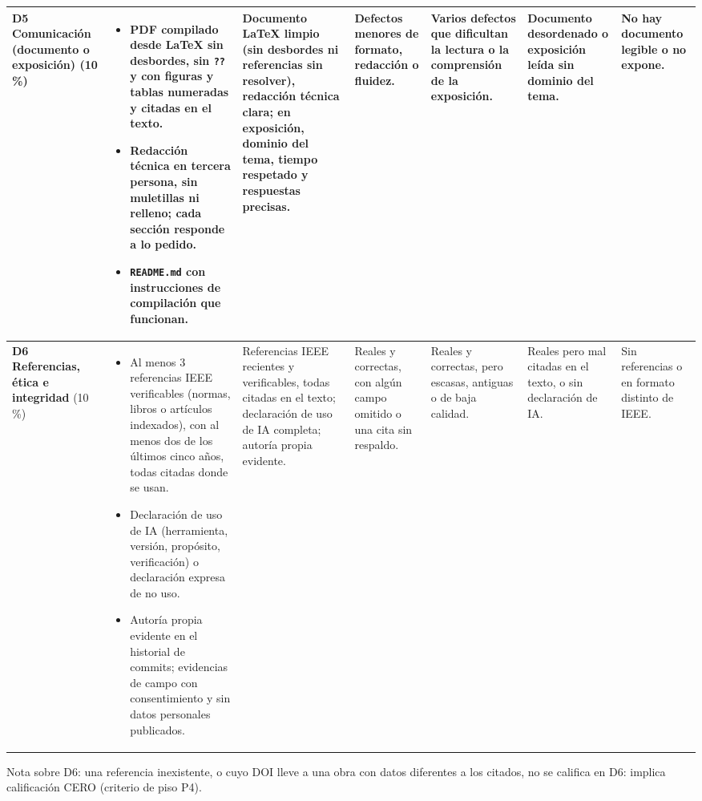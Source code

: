 \documentclass[11pt]{article}
\begin{document}
\begin{landscape}
{\begin{longtable}{|L{2.4cm}|L{5.6cm}|L{3.1cm}|L{2.8cm}|L{2.8cm}|L{2.7cm}|L{2.1cm}|}
	\textbf{D5 Comunicación (documento o exposición)} (10\,\%) & \begin{itemize}[leftmargin=9pt,itemsep=0pt,topsep=0pt,parsep=0pt,partopsep=0pt,after=\vspace{-\baselineskip}]\item PDF compilado desde \LaTeX{} sin desbordes, sin \texttt{??} y con figuras y tablas numeradas y citadas en el texto.\item Redacción técnica en tercera persona, sin muletillas ni relleno; cada sección responde a lo pedido.\item \texttt{README.md} con instrucciones de compilación que funcionan.\end{itemize} & Documento \LaTeX{} limpio (sin desbordes ni referencias sin resolver), redacción técnica clara; en exposición, dominio del tema, tiempo respetado y respuestas precisas. & Defectos menores de formato, redacción o fluidez. & Varios defectos que dificultan la lectura o la comprensión de la exposición. & Documento desordenado o exposición leída sin dominio del tema. & No hay documento legible o no expone.\\
	\hline
	\textbf{D6 Referencias, ética e integridad} (10\,\%) & \begin{itemize}[leftmargin=9pt,itemsep=0pt,topsep=0pt,parsep=0pt,partopsep=0pt,after=\vspace{-\baselineskip}]\item Al menos 3 referencias IEEE verificables (normas, libros o artículos indexados), con al menos dos de los últimos cinco años, todas citadas donde se usan.\item Declaración de uso de IA (herramienta, versión, propósito, verificación) o declaración expresa de no uso.\item Autoría propia evidente en el historial de commits; evidencias de campo con consentimiento y sin datos personales publicados.\end{itemize} & Referencias IEEE recientes y verificables, todas citadas en el texto; declaración de uso de IA completa; autoría propia evidente. & Reales y correctas, con algún campo omitido o una cita sin respaldo. & Reales y correctas, pero escasas, antiguas o de baja calidad. & Reales pero mal citadas en el texto, o sin declaración de IA. & Sin referencias o en formato distinto de IEEE.\\
	\hline
\end{longtable}
}
{\footnotesize Nota sobre D6: una referencia inexistente, o cuyo DOI lleve a una obra con datos diferentes a los citados, no se califica en D6: implica calificación CERO (criterio de piso P4).}
\end{landscape}
\end{document}
